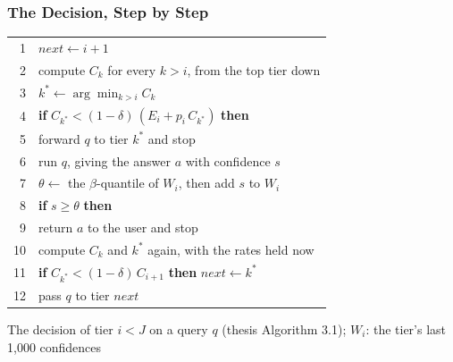 \documentclass[aspectratio=169]{beamer}
\newcommand{\source}[1]{{\par\smallskip\centering\tiny\color{InfGray}#1\par}}
\begin{document}
\begin{frame}
  \frametitle{The Decision, Step by Step}
  \centering
  {\small\renewcommand{\arraystretch}{1.12}
  \begin{tabular}{@{}r@{\hspace{10pt}}l@{}}
    {\color{InfGray}1}  & $\mathit{next} \leftarrow i+1$ \\
    {\color{InfGray}2}  & {\color{InfRed}compute $C_k$ for every $k > i$, from the top tier down} \\
    {\color{InfGray}3}  & {\color{InfRed}$k^* \leftarrow \arg\min_{k>i} C_k$} \\
    {\color{InfGray}4}  & {\color{InfRed}\textbf{if} $C_{k^*} < (1-\delta)\,(E_i + p_i\,C_{k^*})$ \textbf{then}} \\
    {\color{InfGray}5}  & {\color{InfRed}\quad forward $q$ to tier $k^*$ and stop} \\
    {\color{InfGray}6}  & run $q$, giving the answer $a$ with confidence $s$ \\
    {\color{InfGray}7}  & $\theta \leftarrow$ the $\beta$-quantile of $W_i$, then add $s$ to $W_i$ \\
    {\color{InfGray}8}  & \textbf{if} $s \geq \theta$ \textbf{then} \\
    {\color{InfGray}9}  & \quad return $a$ to the user and stop \\
    {\color{InfGray}10} & {\color{InfRed}compute $C_k$ and $k^*$ again, with the rates held now} \\
    {\color{InfGray}11} & {\color{InfRed}\textbf{if} $C_{k^*} < (1-\delta)\,C_{i+1}$ \textbf{then} $\mathit{next} \leftarrow k^*$} \\
    {\color{InfGray}12} & pass $q$ to tier $\mathit{next}$
  \end{tabular}}
  \source{The decision of tier $i < J$ on a query $q$ (thesis Algorithm 3.1);
    $W_i$: the tier's last 1,000 confidences}
\end{frame}
\end{document}
